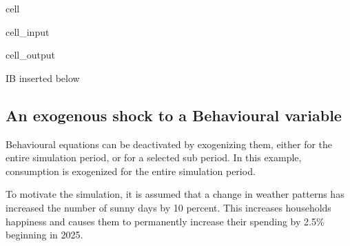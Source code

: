 \documentclass[letterpaper,10pt,english]{jupyterBook}
\begin{document}
\begin{sphinxuseclass}{cell}\begin{sphinxVerbatimInput}

\begin{sphinxuseclass}{cell_input}
\begin{sphinxVerbatim}[commandchars=\\\{\}]
\PYG{p}{[}\PYG{p}{]}
\end{sphinxVerbatim}

\end{sphinxuseclass}\end{sphinxVerbatimInput}
\begin{sphinxVerbatimOutput}

\begin{sphinxuseclass}{cell_output}
\noindent{}

\end{sphinxuseclass}\end{sphinxVerbatimOutput}

\end{sphinxuseclass}
\sphinxAtStartPar
IB inserted below


\subsection{An exogenous shock to a Behavioural variable}
\label{\detokenize{content/05_WBModels/ScenarioAnalysis:an-exogenous-shock-to-a-behavioural-variable}}
\sphinxAtStartPar
Behavioural equations can be de\sphinxhyphen{}activated by exogenizing them, either for the entire simulation period, or for a selected sub period.  In this example, consumption is exogenized for the entire simulation period.

\sphinxAtStartPar
To motivate the simulation, it is assumed that a change in weather patterns has increased the number of sunny days by 10 percent. This increases households happiness and causes them to permanently increase their spending by 2.5\% beginning in 2025.
\end{document}
